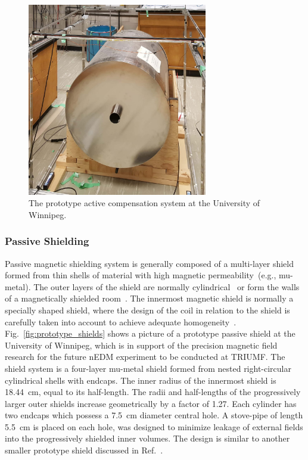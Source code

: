 \begin{figure}[h!]
  \centering
  \includegraphics[width=0.7\textwidth]{active_prototype.jpg}
  \caption[TUCAN's prototype active compensation system]{The prototype
    active compensation system at the University of Winnipeg.}
  \label{fig:prototype_active}
\end{figure}

\subsubsection{Passive Shielding}


Passive magnetic shielding system is generally composed of a multi-layer
shield formed from thin shells of material with high magnetic
permeability~(e.g., mu-metal).  The outer layers of the shield are
normally cylindrical~\cite{serebrov2014new,baker2011search} or form
the walls of a magnetically shielded
room~\cite{altarev2014magnetically,altarev2015minimizing}.  The
innermost magnetic shield is normally a specially shaped shield, where
the design of the coil in relation to the shield is carefully taken
into account to achieve adequate
homogeneity~\cite{Baker2006,Kirch_talk,altarev2012next}. Fig.~\ref{fig:prototype_shields}
shows a picture of a prototype passive shield at the University of
Winnipeg, which is in support of the precision magnetic field research
for the future nEDM experiment to be conducted at TRIUMF.  The shield
system is a four-layer mu-metal shield formed from nested
right-circular cylindrical shells with endcaps.  The inner radius of
the innermost shield is 18.44~cm, equal to its half-length. The radii
and half-lengths of the progressively larger outer shields increase
geometrically by a factor of 1.27.  Each cylinder has two endcaps
which possess a 7.5~cm diameter central hole.  A stove-pipe of length
5.5~cm is placed on each hole, was designed to minimize leakage of
external fields into the progressively shielded inner volumes.  The
design is similar to another smaller prototype shield discussed in
Ref.~\cite{martin2015large}.

